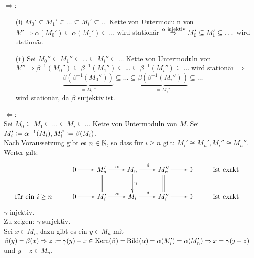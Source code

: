 \documentclass[a4paper, 10pt]{report}
\begin{document}
\begin{Bew} 
  \glqq$\Rightarrow$\grqq:
  \begin{enumerate}
    \item[(i)] $M_0' \subseteq M_1' \subseteq \dots  \subseteq M_i' \subseteq
               \dots$ Kette von Untermoduln von $M' \Rightarrow \alpha(M_0')
               \subseteq \alpha(M_1') \subseteq \dots$ wird stationär
               $\overset{\alpha \text{ \scriptsize injektiv}}{\Rightarrow} M_0'
               \subseteq M_1' \subseteq \dots$ wird stationär.
    \item[(ii)] Sei $M_0'' \subseteq M_1'' \subseteq \dots \subseteq M_i''
                \subseteq \dots$ Kette von Untermoduln von $M'' \Rightarrow
                \beta^{-1}(M_0'') \subseteq \beta^{-1}(M_1'') \subseteq \dots
                \subseteq \beta^{-1}(M_i'') \subseteq \dots$ wird stationär
                $\Rightarrow$
                \[ \underset{= M_0''
                }{\underbrace{\beta(\beta^{-1}(M_0''))}} \subseteq \dots \subseteq
                \underset{=M_i''}{\underbrace{\beta(\beta^{-1}(M_i''))}}
                \subseteq \dots
                \]
                wird stationär, da $\beta$ surjektiv ist.
  \end{enumerate}
  \glqq$\Leftarrow$\grqq:\\
  Sei $M_0 \subseteq M_1 \subseteq \dots  \subseteq M_i \subseteq \dots$
  Kette von Untermoduln von $M$. Sei $M_i' \mathrel{\mathop:}= \alpha^{-1}(M_i), M_i''
  \mathrel{\mathop:}= \beta(M_i)$.\\
  Nach Voraussetzung gibt es $n \in \mathbb{N}$, so dass für $i \ge n$ gilt:
  $M_i' \cong M_n', M_i'' \cong M_n''$. Weiter gilt:
  \[
  \begin{xy}
    \xymatrix{
      & 0 \ar@{->}[r] & M_n' \ar@{=}[d] \ar@{->}[r]^{\alpha} & M_n
      \ar@{->}[d]^{\gamma}
      \ar@{->}[r]^{\beta} & M_n''  \ar@{=}[d] \ar@{->}[r] & 0 & \text{ist 
      exakt}\\
      \text{für ein } i \ge n& 0  \ar@{->}[r] & M_i' \ar@{->}[r]^{\alpha} & M_i
      \ar@{->}[r]^{\beta} & M_i'' \ar@{->}[r] & 0 &
      \text{ist exakt}}
  \end{xy}\]
  $\gamma$ injektiv.\\
  Zu zeigen: $\gamma$ surjektiv.\\
  Sei $x \in M_i$, dazu gibt es ein $y \in M_n$ mit $\beta(y) = \beta(x)
  \Rightarrow z \mathrel{\mathop:}= \gamma(y)-x \in \mathrm{Kern}(\beta) = \mathrm{Bild}(\alpha)
  = \alpha(M_i') = \alpha(M_n') \Rightarrow x = \gamma(y - z)$ und $y-z \in M_n$.
\end{Bew}
\end{document}
